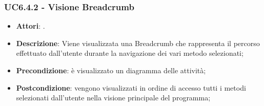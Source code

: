 \subsubsection{UC6.4.2 - Visione Breadcrumb} 
\label{sssec:UC6.4.2} 
\begin{itemize} 
\item \textbf{Attori}: .
\item \textbf{Descrizione}: Viene visualizzata una Breadcrumb che rappresenta il percorso effettuato dall'utente durante la navigazione dei vari metodo selezionati;
\item \textbf{Precondizione}: è visualizzato un diagramma delle attività;
\item \textbf{Postcondizione}: vengono visualizzati in ordine di accesso tutti i metodi selezionati dall'utente nella visione principale del programma;
\end{itemize} 
